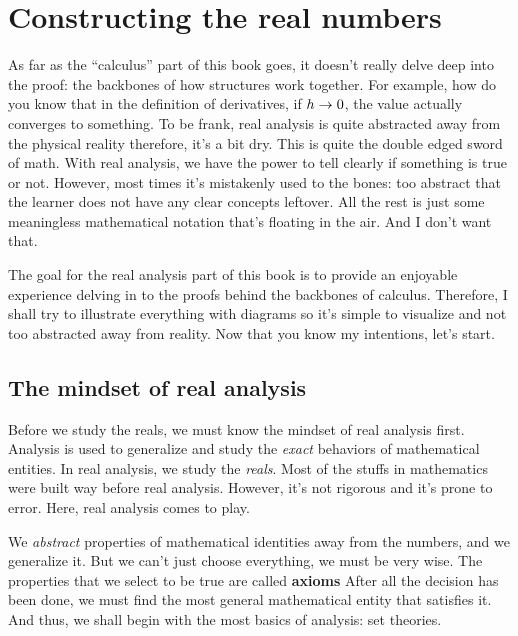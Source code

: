 \chapter{Constructing the real numbers}

\begin{abstract}
\end{abstract}

As far as the ``calculus'' part of this book goes, it doesn't really delve deep into the proof: the backbones of how structures work together. For example, how do you know that in the definition of derivatives, if $h \rightarrow 0$, the value actually converges to something. To be frank, real analysis is quite abstracted away from the physical reality therefore, it's a bit dry. This is quite the double edged sword of math. With real analysis, we have the power to tell clearly if something is true or not. However, most times it's mistakenly used to the bones: too abstract that the learner does not have any clear concepts leftover. All the rest is just some meaningless mathematical notation that's floating in the air. And I don't want that.

The goal for the real analysis part of this book is to provide an enjoyable experience delving in to the proofs behind the backbones of calculus. Therefore, I shall try to illustrate everything with diagrams so it's simple to visualize and not too abstracted away from reality. Now that you know my intentions, let's start.

\section{The mindset of real analysis}

Before we study the reals, we must know the mindset of real analysis first. Analysis is used to generalize and study the \emph{exact} behaviors of mathematical entities. In real analysis, we study the \emph{reals}. Most of the stuffs in mathematics were built way before real analysis. However, it's not rigorous and it's prone to error. Here, real analysis comes to play.

We \emph{abstract} properties of mathematical identities away from the numbers, and we generalize it. But we can't just choose everything, we must be very wise. The properties that we select to be true are called \textbf{axioms} After all the decision has been done, we must find the most general mathematical entity that satisfies it. And thus, we shall begin with the most basics of analysis: set theories.

